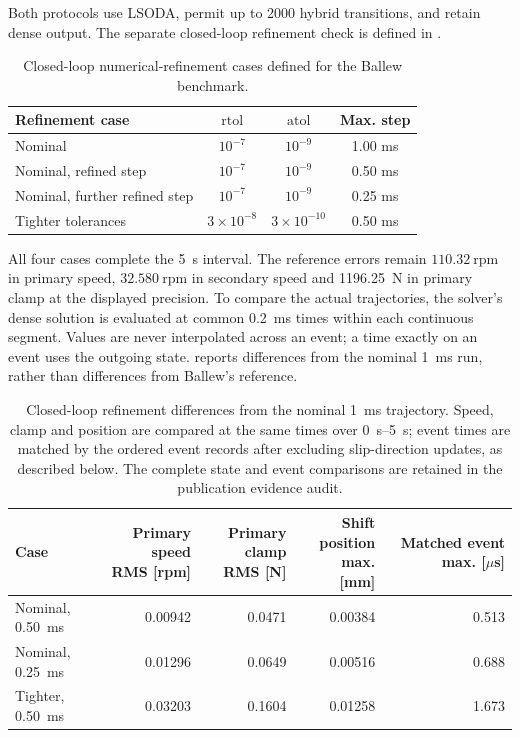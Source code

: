 \documentclass[11pt]{report}
\numberwithin{equation}{section}
\begin{document}
Both protocols use LSODA, permit up to 2000 hybrid transitions, and retain
dense output. The separate closed-loop refinement check is defined in
.

\begin{table}[H]
\centering
\small
\begin{tabular}{@{}lccc@{}}
\toprule
Refinement case & \(\mathrm{rtol}\) & \(\mathrm{atol}\) & Max. step \\
\midrule
Nominal & \(10^{-7}\) & \(10^{-9}\) & 1.00 ms \\
Nominal, refined step & \(10^{-7}\) & \(10^{-9}\) & 0.50 ms \\
Nominal, further refined step & \(10^{-7}\) & \(10^{-9}\) & 0.25 ms \\
Tighter tolerances & \(3\times10^{-8}\) & \(3\times10^{-10}\) & 0.50 ms \\
\bottomrule
\end{tabular}
\caption{Closed-loop numerical-refinement cases defined for the Ballew benchmark.}
\label{tab:ballew_refinement_settings}
\end{table}

All four cases complete the \SI{5}{s} interval. The reference errors remain
\(110.32~\mathrm{rpm}\) in primary speed, \(32.580~\mathrm{rpm}\) in secondary
speed and \SI{1196.25}{N} in primary clamp at the displayed precision.
To compare the actual trajectories, the solver's dense solution is evaluated
at common \SI{0.2}{ms} times within each continuous segment. Values are never
interpolated across an event; a time exactly on an event uses the outgoing
state.  reports differences from the nominal
\SI{1}{ms} run, rather than differences from Ballew's reference.

\begin{table}[H]
\centering\small
\begin{tabular}{@{}lrrrr@{}}
\toprule
Case & \makecell{Primary speed\\RMS [rpm]} & \makecell{Primary clamp\\RMS [N]}
 & \makecell{Shift position\\max. [mm]} & \makecell{Matched event\\max. [\(\mu\)s]} \\
\midrule
Nominal, \SI{0.50}{ms} & 0.00942 & 0.0471 & 0.00384 & 0.513 \\
Nominal, \SI{0.25}{ms} & 0.01296 & 0.0649 & 0.00516 & 0.688 \\
Tighter, \SI{0.50}{ms} & 0.03203 & 0.1604 & 0.01258 & 1.673 \\
\bottomrule
\end{tabular}
\caption{Closed-loop refinement differences from the nominal \SI{1}{ms}
trajectory. Speed, clamp and position are compared at the same times over
\SIrange{0}{5}{s}; event times are matched by the ordered event records after
excluding slip-direction updates, as described below. The complete state and
event comparisons are retained in the publication evidence audit.}
\label{tab:ballew_refinement_results}
\end{table}
\end{document}
